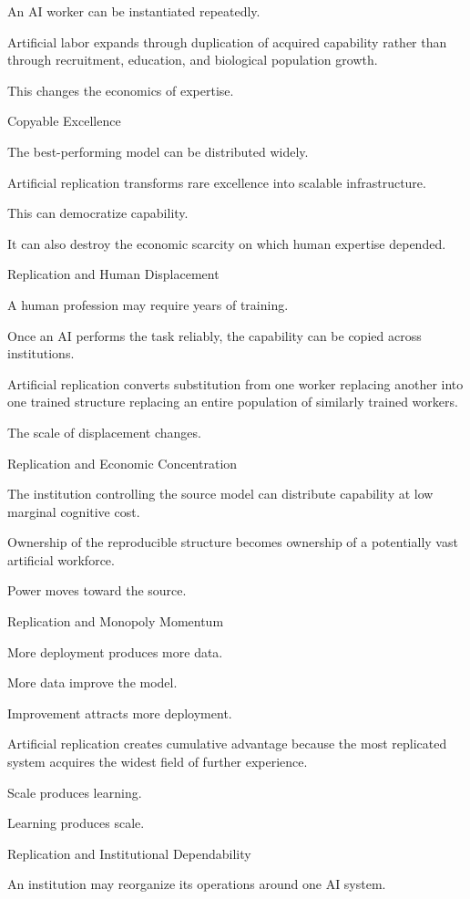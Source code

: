 An AI worker can be instantiated repeatedly.

Artificial labor expands through duplication of acquired capability rather than through recruitment, education, and biological population growth.

This changes the economics of expertise.

Copyable Excellence

The best-performing model can be distributed widely.

Artificial replication transforms rare excellence into scalable infrastructure.

This can democratize capability.

It can also destroy the economic scarcity on which human expertise depended.

Replication and Human Displacement

A human profession may require years of training.

Once an AI performs the task reliably, the capability can be copied across institutions.

Artificial replication converts substitution from one worker replacing another into one trained structure replacing an entire population of similarly trained workers.

The scale of displacement changes.

Replication and Economic Concentration

The institution controlling the source model can distribute capability at low marginal cognitive cost.

Ownership of the reproducible structure becomes ownership of a potentially vast artificial workforce.

Power moves toward the source.

Replication and Monopoly Momentum

More deployment produces more data.

More data improve the model.

Improvement attracts more deployment.

Artificial replication creates cumulative advantage because the most replicated system acquires the widest field of further experience.

Scale produces learning.

Learning produces scale.

Replication and Institutional Dependability

An institution may reorganize its operations around one AI system.

